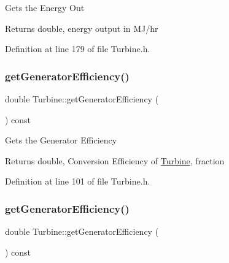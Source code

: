 Gets the Energy Out

\begin{DoxyReturn}{Returns}
double, energy output in M\+J/hr 
\end{DoxyReturn}


Definition at line 179 of file Turbine.\+h.

\mbox{\label{class_turbine_a92266fd994310d1842ba37c05bc40bf8}} 
\subsubsection{\texorpdfstring{get\+Generator\+Efficiency()}{getGeneratorEfficiency()}\hspace{0.1cm}{\footnotesize\ttfamily [1/3]}}
{\footnotesize\ttfamily double Turbine\+::get\+Generator\+Efficiency (\begin{DoxyParamCaption}{ }\end{DoxyParamCaption}) const\hspace{0.3cm}{\ttfamily [inline]}}

Gets the Generator Efficiency

\begin{DoxyReturn}{Returns}
double, Conversion Efficiency of \hyperlink{class_turbine}{Turbine}, fraction 
\end{DoxyReturn}


Definition at line 101 of file Turbine.\+h.

\mbox{\label{class_turbine_a92266fd994310d1842ba37c05bc40bf8}} 
\subsubsection{\texorpdfstring{get\+Generator\+Efficiency()}{getGeneratorEfficiency()}\hspace{0.1cm}{\footnotesize\ttfamily [2/3]}}
{\footnotesize\ttfamily double Turbine\+::get\+Generator\+Efficiency (\begin{DoxyParamCaption}{ }\end{DoxyParamCaption}) const\hspace{0.3cm}{\ttfamily [inline]}}


